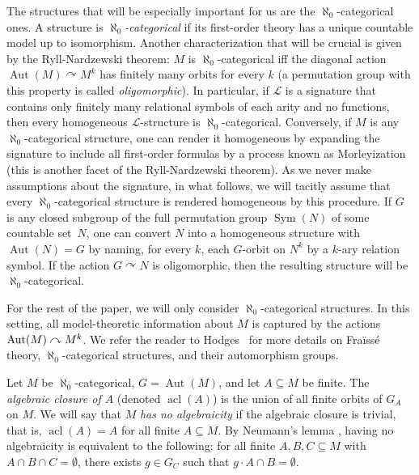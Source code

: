 \documentclass[JEP,XML,SOM,Unicode,published]{cedram}
\let\mathcal\mathscr
\let\actson\curvearrowright
\let\sub\subseteq
\theoremstyle{plain}
\theoremstyle{definition}
\newcommand{\cL}{\mathcal{L}}
\DeclareMathOperator{\acl}{acl}
\DeclareMathOperator{\Aut}{Aut}
\DeclareMathOperator{\Sym}{Sym}
\begin{document}
The structures that will be especially important for us are the $\aleph_0$-categorical ones. A structure is \emph{$\aleph_0$-categorical} if its first-order theory has a unique countable model up to isomorphism. Another characterization that will be crucial is given by the Ryll-Nardzewski theorem: $M$ is $\aleph_0$-categorical iff the diagonal action $\Aut(M) \actson M^k$ has finitely many orbits for every $k$ (a permutation group with this property is called \emph{oligomorphic}). In particular, if $\cL$ is a signature that contains only finitely many relational symbols of each arity and no functions, then every homogeneous $\cL$-structure is $\aleph_0$-categorical. Conversely, if $M$ is any $\aleph_0$-categorical structure, one can render it homogeneous by expanding the signature to include all first-order formulas by a process known as Morleyization (this is another facet of the Ryll-Nardzewski theorem). As we never make assumptions about the signature, in what follows, we will tacitly assume that every $\aleph_0$-categorical structure is rendered homogeneous by this procedure. If $G$ is any closed subgroup of the full permutation group $\Sym(N)$ of some countable set~$N$, one can convert $N$ into a homogeneous structure with $\Aut(N) = G$ by naming, for every $k$, each $G$-orbit on $N^k$ by a $k$-ary relation symbol. If the action $G \actson N$ is oligomorphic, then the resulting structure will be $\aleph_0$-categorical.

For the rest of the paper, we will only consider $\aleph_0$-categorical structures. In this setting, all model-theoretic information about $M$ is captured by the actions $\Aut(M) \actson\nobreak M^k$. We refer the reader to Hodges~\cite{Hodges1993} for more details on Fraïssé theory, $\aleph_0$-categorical structures, and their automorphism groups.

Let $M$ be $\aleph_0$-categorical, $G = \Aut(M)$, and let $A \sub M$ be finite. The \emph{algebraic closure of $A$} (denoted $\acl(A)$) is the union of all finite orbits of $G_A$ on $M$. We will say that $M$ \emph{has no algebraicity} if the algebraic closure is trivial, that is, $\acl(A) = A$ for all finite $A \sub M$. By Neumann's lemma \cite[Lem.\,4.2.1]{Hodges1993}, having no algebraicity is equivalent to the following: for all finite $A, B, C \sub M$ with $A \cap B \cap C = \emptyset$, there exists $g \in G_C$ such that $g \cdot A \cap B = \emptyset$.
\end{document}
